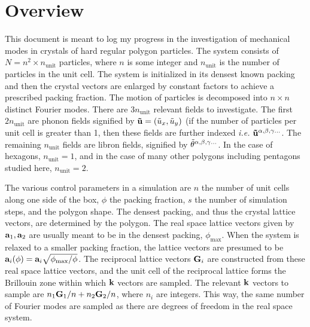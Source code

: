 \documentclass[12pt]{article}
\begin{document}
\section{Overview}
This document is meant to log my progress in the investigation of mechanical 
modes in crystals of hard regular polygon particles. The system consists of $N 
= n^2\times n_{\mathrm{unit}}$ particles, where $n$ is some integer and 
$n_\mathrm{unit}$ is the number of particles in the unit cell. The system is 
initialized in its densest known packing and then the crystal vectors are 
enlarged by constant factors to achieve a prescribed packing fraction. The 
motion of particles is decomposed into $n\times n$ distinct Fourier modes. 
There are $3n_\mathrm{unit}$ relevant fields to investigate. The first 
$2n_\mathrm{unit}$ are phonon fields signified by $\mathbf{\tilde u} = 
\left(\tilde u_x, \tilde u_y\right)$ (if the number of particles per unit cell is 
greater than 1, then these fields are further indexed \emph{i.e.\!} $\mathbf{\tilde 
u}^{\alpha,\beta,\gamma\ldots}$. The remaining $n_\mathrm{unit}$ fields are libron fields, 
signified by $\tilde {\theta}^{\alpha,\beta,\gamma\ldots}$. In the case of hexagons, 
$n_\mathrm{unit} = 1$, and in the case of many other polygons including 
pentagons studied here, $n_\mathrm{unit} = 2$.

The various control parameters in a simulation are $n$ the number of unit 
cells along one side of the box, $\phi$ the packing fraction, $s$ the number of 
simulation steps, and the polygon shape. The densest packing, and thus the 
crystal lattice vectors, are determined by the polygon. The real space lattice 
vectors given by $\mathbf{a}_1, \mathbf{a}_2$ are usually meant to be in the densest 
packing, $\phi_\mathrm{max}$. When the system is relaxed to a smaller packing 
fraction, the lattice vectors are presumed to be $\mathbf{a}_i(\phi) = \mathbf{a}_i 
\sqrt{\phi_\mathrm{max}/\phi}$. The reciprocal lattice vectors $\mathbf{G}_i$ are 
constructed from these real space lattice vectors, and the unit cell of the 
reciprocal lattice forms the Brillouin zone within which $\mathbf{k}$ vectors are 
sampled. The relevant $\mathbf{k}$ vectors to sample are $n_1 \mathbf{G}_1/n + n_2 \mathbf{G}_2/n$, where $n_i$ are integers. This way, the same number of Fourier modes 
are sampled as there are degrees of freedom in the real space system.
\end{document}
